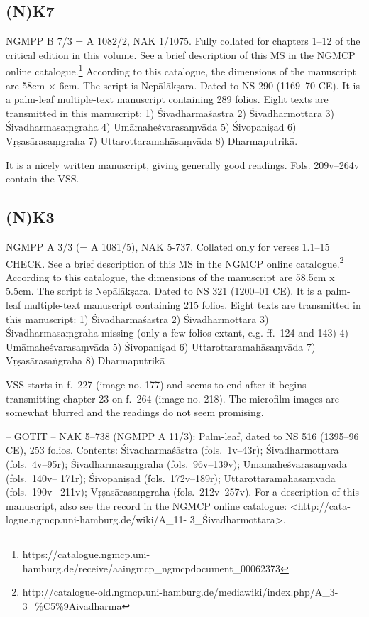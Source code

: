 \documentclass[12pt]{book}
\begin{document}
{%
\subsection{(N)K7}\label{nk7}}

NGMPP B 7/3 = A 1082/2, NAK 1/1075. Fully collated for chapters 1--12 of
the critical edition in this volume. See a brief description of this MS
in the NGMCP online catalogue.\footnote{https://catalogue.ngmcp.uni-hamburg.de/receive/aaingmcp\_ngmcpdocument\_00062373}
According to this catalogue, the dimensions of the manuscript are 58cm ×
6cm. The script is Nepālākṣara. Dated to NS 290 (1169--70 CE). It is a
palm-leaf multiple-text manuscript containing 289 folios. Eight texts
are transmitted in this manuscript: 1) Śivadharmaśāstra 2)
Śivadharmottara 3) Śivadharmasaṃgraha 4) Umāmaheśvarasaṃvāda 5)
Śivopaniṣad 6) Vṛṣasārasaṃgraha 7) Uttarottaramahāsaṃvāda 8)
Dharmaputrikā.

It is a nicely written manuscript, giving generally good readings. Fols.
209v--264v contain the VSS.

{%
\subsection{(N)K3}\label{nk3}}

NGMPP A 3/3 (= A 1081/5), NAK 5-737. Collated only for verses 1.1--15
CHECK. See a brief description of this MS in the NGMCP online
catalogue.\footnote{http://catalogue-old.ngmcp.uni-hamburg.de/mediawiki/index.php/A\_3-3\_\%C5\%9Aivadharma
} According to this catalogue, the dimensions of the manuscript are
58.5cm x 5.5cm. The script is Nepālākṣara. Dated to NS 321 (1200--01
CE). It is a palm-leaf multiple-text manuscript containing 215 folios.
Eight texts are transmitted in this manuscript: 1) Śivadharmaśāstra 2)
Śivadharmottara 3) Śivadharmasaṃgraha missing (only a few folios extant,
e.g. ff.~124 and 143) 4) Umāmaheśvarasaṃvāda 5) Śivopaniṣad 6)
Uttarottaramahāsaṃvāda 7) Vṛṣasārasaṅgraha 8) Dharmaputrikā

VSS starts in f.~227 (image no. 177) and seems to end after it begins
transmitting chapter 23 on f.~264 (image no. 218). The microfilm images
are somewhat blurred and the readings do not seem promising.

-- GOTIT -- NAK 5--738 (NGMPP A 11/3): Palm-leaf, dated to NS 516
(1395--96 CE), 253 folios. Contents: Śivadharmaśāstra (fols.~1v--43r);
Śivadharmottara (fols.~4v--95r); Śivadharmasaṃgraha (fols.~96v--139v);
Umāmaheśvarasaṃvāda (fols.~140v-- 171r); Śivopaniṣad (fols.~172v--189r);
Uttarottaramahāsaṃvāda (fols.~190v-- 211v); Vṛṣasārasaṃgraha
(fols.~212v--257v). For a description of this manuscript, also see the
record in the NGMCP online catalogue: \textless{}http://cata-
logue.ngmcp.uni-hamburg.de/wiki/A\_11- 3\_Śivadharmottara\textgreater{}.
\end{document}

